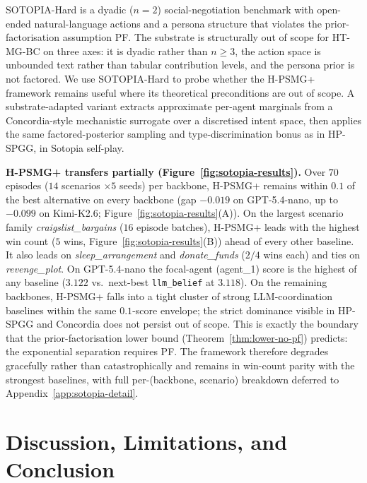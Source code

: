 ﻿\documentclass{article}
\def\textsuperscript#1{#1}%
\begin{document}
SOTOPIA-Hard \citep{zhou2024sotopia} is a dyadic ($n{=}2$) social-negotiation benchmark with open-ended natural-language actions and a persona structure that violates the prior-factorisation assumption PF. The substrate is structurally out of scope for HT-MG-BC on three axes: it is dyadic rather than $n\!\geq\!3$, the action space is unbounded text rather than tabular contribution levels, and the persona prior is not factored. We use SOTOPIA-Hard to probe whether the H-PSMG\textsuperscript{+} framework remains useful where its theoretical preconditions are out of scope. A substrate-adapted variant extracts approximate per-agent marginals from a Concordia-style mechanistic surrogate over a discretised intent space, then applies the same factored-posterior sampling and type-discrimination bonus as in HP-SPGG, in Sotopia self-play.

\textbf{H-PSMG\textsuperscript{+} transfers partially (Figure~\ref{fig:sotopia-results}).} Over $70$ episodes ($14$ scenarios $\times 5$ seeds) per backbone, H-PSMG\textsuperscript{+} remains within $0.1$ of the best alternative on every backbone (gap $-0.019$ on GPT-5.4-nano, up to $-0.099$ on Kimi-K2.6; Figure~\ref{fig:sotopia-results}(A)). On the largest scenario family \emph{craigslist\_bargains} ($16$ episode batches), H-PSMG\textsuperscript{+} leads with the highest win count ($5$ wins, Figure~\ref{fig:sotopia-results}(B)) ahead of every other baseline. It also leads on \emph{sleep\_arrangement} and \emph{donate\_funds} ($2/4$ wins each) and ties on \emph{revenge\_plot}. On GPT-5.4-nano the focal-agent (agent\_1) score is the highest of any baseline ($3.122$ vs.\ next-best \texttt{llm\_belief} at $3.118$). On the remaining backbones, H-PSMG\textsuperscript{+} falls into a tight cluster of strong LLM-coordination baselines within the same $0.1$-score envelope; the strict dominance visible in HP-SPGG and Concordia does not persist out of scope. This is exactly the boundary that the prior-factorisation lower bound (Theorem~\ref{thm:lower-no-pf}) predicts: the exponential separation requires PF. The framework therefore degrades gracefully rather than catastrophically and remains in win-count parity with the strongest baselines, with full per-(backbone, scenario) breakdown deferred to Appendix~\ref{app:sotopia-detail}.

\section{Discussion, Limitations, and Conclusion}
\label{sec:discussion}
\end{document}
